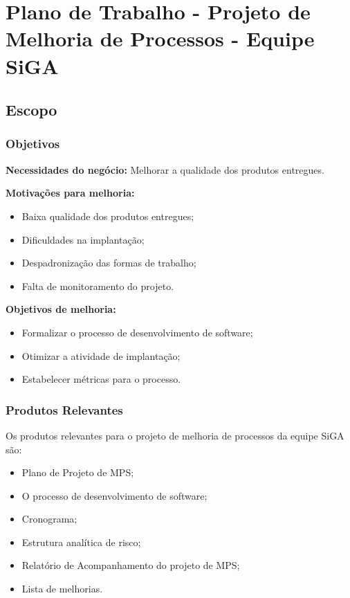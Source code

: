 \chapter{Plano de Trabalho - Projeto de Melhoria de Processos - Equipe SiGA}
\label{plano_de_projeto}
\section*{Escopo}

\subsection*{Objetivos}

\textbf{Necessidades do negócio:} 
Melhorar a qualidade dos produtos entregues.

\textbf{Motivações para melhoria:} 
\begin{itemize}
	\item Baixa qualidade dos produtos entregues;
	\item Dificuldades na implantação;
	\item Despadronização das formas de trabalho;
	\item Falta de monitoramento do projeto.
\end{itemize}

\textbf{Objetivos de melhoria:} 
\begin{itemize}
	\item Formalizar o processo de desenvolvimento de software;
	\item Otimizar a atividade de implantação;
	\item Estabelecer métricas para o processo.
\end{itemize}

\subsection*{Produtos Relevantes}

	Os produtos relevantes para o projeto de melhoria de processos da equipe SiGA são:
	
	\begin{itemize}
		\item Plano de Projeto de MPS;
		\item O processo de desenvolvimento de software;
		\item Cronograma;
		\item Estrutura analítica de risco;
		\item Relatório de Acompanhamento do projeto de MPS;
		\item Lista de melhorias.
	\end{itemize}


